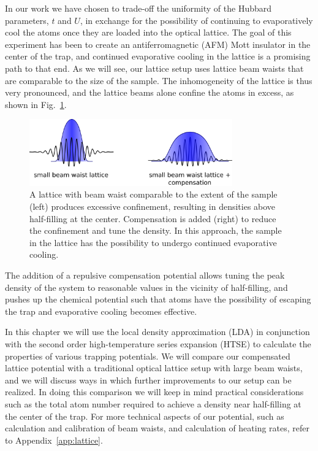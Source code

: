 In our work we have chosen to trade-off the uniformity of the Hubbard
parameters, $t$ and $U$, in exchange for the possibility of continuing to
evaporatively cool the atoms once they are loaded into the optical lattice.
The goal of this experiment has been to create an antiferromagnetic (AFM) Mott
insulator in the center of the trap, and continued evaporative cooling in the
lattice is a promising path to that end.  As we will see, our lattice setup
uses lattice beam waists that are comparable to the size of the sample.   The
inhomogeneity of the lattice is thus very pronounced, and the lattice beams
alone confine the atoms in excess, as shown in Fig.~\ref{fig:comp-uncomp2}. 
\begin{figure}
    \centering
\includegraphics[width=0.78\textwidth]{../illustrations/lattice/comp+uncomp-inhom2.png}
\caption{\small A lattice with beam waist comparable to the extent of the sample
(left)  produces excessive confinement, resulting in densities above
half-filling at the center.  Compensation is added (right) to reduce the
confinement and tune the density.  In this approach, the sample in the lattice
has the possibility to undergo continued evaporative cooling. }
\label{fig:comp-uncomp2}
\end{figure}
The addition of a repulsive compensation potential allows tuning the peak
density of the system to reasonable values in the vicinity of half-filling, and
pushes up the chemical potential such that atoms have the possibility of
escaping the trap and evaporative cooling becomes effective. 

In this chapter we will use the local density approximation (LDA) in
conjunction with the second order high-temperature series expansion (HTSE) to
calculate the properties of various trapping potentials.   We will compare our
compensated lattice potential with a traditional optical lattice setup with
large beam waists, and we will discuss ways in which further improvements to
our setup can be realized.  In doing this comparison we will keep in mind
practical considerations such as the total atom number required to achieve a
density near half-filling at the center of the trap.  For more technical
aspects of our potential, such as calculation and calibration of beam waists,
and calculation of heating rates, refer to Appendix~\ref{app:lattice}.  


